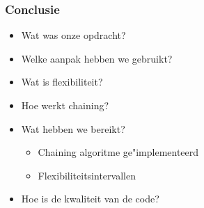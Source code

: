 \begin{frame}\frametitle{Conclusie}
    \begin{itemize}
        \item Wat was onze opdracht?
        \item Welke aanpak hebben we gebruikt?
        \item Wat is flexibiliteit?
        \item Hoe werkt chaining?
        \item Wat hebben we bereikt?
        \begin{itemize}
            \item Chaining algoritme ge"implementeerd
            \item Flexibiliteitsintervallen
        \end{itemize}
        \item Hoe is de kwaliteit van de code?
    \end{itemize}
\end{frame}
